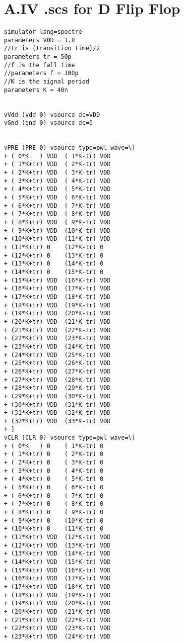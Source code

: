 \section{A.IV \qquad .scs for D Flip Flop}

\paragraph{}
\begin{lstlisting}
simulator lang=spectre
parameters VDD = 1.8
//tr is (transition time)/2
parameters tr = 50p
//f is the fall time
//parameters f = 100p
//K is the signal period
parameters K = 40n


vVdd (vdd 0) vsource dc=VDD
vGnd (gnd 0) vsource dc=0


vPRE (PRE 0) vsource type=pwl wave=\[
+ ( 0*K   ) VDD  ( 1*K-tr) VDD
+ ( 1*K+tr) VDD  ( 2*K-tr) VDD
+ ( 2*K+tr) VDD  ( 3*K-tr) VDD
+ ( 3*K+tr) VDD  ( 4*K-tr) VDD
+ ( 4*K+tr) VDD  ( 5*K-tr) VDD
+ ( 5*K+tr) VDD  ( 6*K-tr) VDD
+ ( 6*K+tr) VDD  ( 7*K-tr) VDD
+ ( 7*K+tr) VDD  ( 8*K-tr) VDD
+ ( 8*K+tr) VDD  ( 9*K-tr) VDD
+ ( 9*K+tr) VDD  (10*K-tr) VDD
+ (10*K+tr) VDD  (11*K-tr) VDD
+ (11*K+tr) 0    (12*K-tr) 0
+ (12*K+tr) 0    (13*K-tr) 0
+ (13*K+tr) 0    (14*K-tr) 0
+ (14*K+tr) 0    (15*K-tr) 0
+ (15*K+tr) VDD  (16*K-tr) VDD
+ (16*K+tr) VDD  (17*K-tr) VDD
+ (17*K+tr) VDD  (18*K-tr) VDD
+ (18*K+tr) VDD  (19*K-tr) VDD
+ (19*K+tr) VDD  (20*K-tr) VDD
+ (20*K+tr) VDD  (21*K-tr) VDD
+ (21*K+tr) VDD  (22*K-tr) VDD
+ (22*K+tr) VDD  (23*K-tr) VDD
+ (23*K+tr) VDD  (24*K-tr) VDD
+ (24*K+tr) VDD  (25*K-tr) VDD
+ (25*K+tr) VDD  (26*K-tr) VDD
+ (26*K+tr) VDD  (27*K-tr) VDD
+ (27*K+tr) VDD  (28*K-tr) VDD
+ (28*K+tr) VDD  (29*K-tr) VDD
+ (29*K+tr) VDD  (30*K-tr) VDD
+ (30*K+tr) VDD  (31*K-tr) VDD
+ (31*K+tr) VDD  (32*K-tr) VDD
+ (32*K+tr) VDD  (33*K-tr) VDD
+ ]
vCLR (CLR 0) vsource type=pwl wave=\[
+ ( 0*K   ) 0    ( 1*K-tr) 0
+ ( 1*K+tr) 0    ( 2*K-tr) 0
+ ( 2*K+tr) 0    ( 3*K-tr) 0
+ ( 3*K+tr) 0    ( 4*K-tr) 0
+ ( 4*K+tr) 0    ( 5*K-tr) 0
+ ( 5*K+tr) 0    ( 6*K-tr) 0
+ ( 6*K+tr) 0    ( 7*K-tr) 0
+ ( 7*K+tr) 0    ( 8*K-tr) 0
+ ( 8*K+tr) 0    ( 9*K-tr) 0
+ ( 9*K+tr) 0    (10*K-tr) 0
+ (10*K+tr) 0    (11*K-tr) 0
+ (11*K+tr) VDD  (12*K-tr) VDD
+ (12*K+tr) VDD  (13*K-tr) VDD
+ (13*K+tr) VDD  (14*K-tr) VDD
+ (14*K+tr) VDD  (15*K-tr) VDD
+ (15*K+tr) VDD  (16*K-tr) VDD
+ (16*K+tr) VDD  (17*K-tr) VDD
+ (17*K+tr) VDD  (18*K-tr) VDD
+ (18*K+tr) VDD  (19*K-tr) VDD
+ (19*K+tr) VDD  (20*K-tr) VDD
+ (20*K+tr) VDD  (21*K-tr) VDD
+ (21*K+tr) VDD  (22*K-tr) VDD
+ (22*K+tr) VDD  (23*K-tr) VDD
+ (23*K+tr) VDD  (24*K-tr) VDD

\end{lstlisting}
